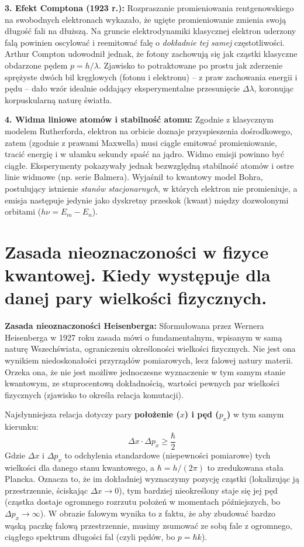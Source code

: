 \documentclass[11pt, a4paper]{article}
\begin{document}
\textbf{3. Efekt Comptona (1923 r.):}
Rozpraszanie promieniowania rentgenowskiego na swobodnych elektronach wykazało, że ugięte promieniowanie zmienia swoją długość fali na dłuższą. Na gruncie elektrodynamiki klasycznej elektron uderzony falą powinien oscylować i reemitować falę o \textit{dokładnie tej samej} częstotliwości. Arthur Compton udowodnił jednak, że fotony zachowują się jak cząstki klasyczne obdarzone pędem $p = h/\lambda$. Zjawisko to potraktowane po prostu jak zderzenie sprężyste dwóch bil kręglowych (fotonu i elektronu) – z praw zachowania energii i pędu – dało wzór idealnie oddający eksperymentalne przesunięcie $\Delta \lambda$, koronując korpuskularną naturę światła.

\textbf{4. Widma liniowe atomów i stabilność atomu:}
Zgodnie z klasycznym modelem Rutherforda, elektron na orbicie doznaje przyspieszenia dośrodkowego, zatem (zgodnie z prawami Maxwella) musi ciągle emitować promieniowanie, tracić energię i w ułamku sekundy spaść na jądro. Widmo emisji powinno być ciągłe. Eksperymenty pokazywały jednak bezwzględną stabilność atomów i ostre linie widmowe (np. serie Balmera). Wyjaśnił to kwantowy model Bohra, postulujący istnienie \textit{stanów stacjonarnych}, w których elektron nie promieniuje, a emisja następuje jedynie jako dyskretny przeskok (kwant) między dozwolonymi orbitami ($h\nu = E_m - E_n$).

\section{Zasada nieoznaczoności w fizyce kwantowej. Kiedy występuje dla danej pary wielkości fizycznych.}

\textbf{Zasada nieoznaczoności Heisenberga:}
Sformułowana przez Wernera Heisenberga w 1927 roku zasada mówi o fundamentalnym, wpisanym w samą naturę Wszechświata, ograniczeniu określoności wielkości fizycznych. Nie jest ona wynikiem niedoskonałości przyrządów pomiarowych, lecz falowej natury materii. Orzeka ona, że nie jest możliwe jednoczesne wyznaczenie w tym samym stanie kwantowym, ze stuprocentową dokładnością, wartości pewnych par wielkości fizycznych (zjawisko to określa relacja komutacji).

Najsłynniejsza relacja dotyczy pary \textbf{położenie ($x$) i pęd ($p_x$)} w tym samym kierunku:
\[
\Delta x \cdot \Delta p_x \ge \frac{\hbar}{2}
\]
Gdzie $\Delta x$ i $\Delta p_x$ to odchylenia standardowe (niepewności pomiarowe) tych wielkości dla danego stanu kwantowego, a $\hbar = h/(2\pi)$ to zredukowana stała Plancka. Oznacza to, że im dokładniej wyznaczymy pozycję cząstki (lokalizując ją przestrzennie, ściskając $\Delta x \to 0$), tym bardziej nieokreślony staje się jej pęd (cząstka dostaje ogromnego rozrzutu położeń w momentach późniejszych, bo $\Delta p_x \to \infty$). W obrazie falowym wynika to z faktu, że aby zbudować bardzo wąską paczkę falową przestrzennie, musimy zsumować ze sobą fale z ogromnego, ciągłego spektrum długości fal (czyli pędów, bo $p = \hbar k$).
\end{document}
